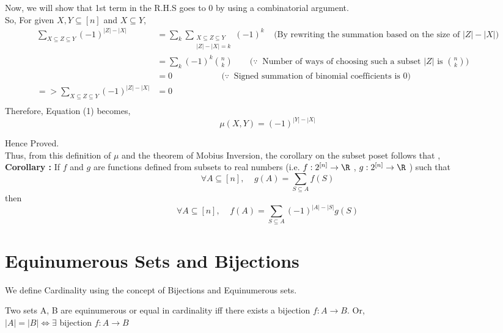\noindent Now, we will show that 1st term in the R.H.S goes to 0 by using a combinatorial argument.\\

\noindent So, For given $X, Y \subseteq [n]$ and $X \subseteq Y$,
\begin{align*}
    \sum_{X \subseteq Z \subseteq Y} (-1)^{|Z|-|X|} &= \sum_{k} \sum_{\substack{X \subseteq Z \subseteq Y\\ |Z| - |X| = k}} (-1)^k ~~~~~\textrm{(By rewriting the summation based on the size of $|Z| - |X|$)}\\
    &= \sum_{k} (-1)^k {n \choose k} ~~~~~~~~~\textrm{($\because~$ Number of ways of choosing such a subset $|Z|$ is ${n \choose k}$) }\\
    &= 0 ~~~~~~~~~~~~~~~~~~~~~~~~~~\textrm{($\because ~$ Signed summation of binomial coefficients is $0$)}\\
=> \sum_{X \subseteq Z \subseteq Y} (-1)^{|Z|-|X|} &= 0\\
\end{align*}
Therefore, Equation (1) becomes,\\

$$\mu (X,Y) = (-1)^{|Y|-|X|}$$

Hence Proved.\\

\noindent Thus, from this definition of $\mu$ and the theorem of Mobius Inversion, the corollary on the subset poset follows that ,\\

\noindent \textbf{Corollary :} If $f$ and $g$ are functions defined from subsets to real numbers (i.e. 
$f: 2^{[n]} \rightarrow \R$ , $g: 2^{[n]} \rightarrow \R $ ) such that
$$\forall A \subseteq [n], ~~~~~ g(A) = \sum_{S \subseteq A} f(S) $$
then
$$\forall A \subseteq [n], ~~~~~ f(A) = \sum\limits_{S \subseteq A} (-1)^{|A|- |S|}g(S)$$



\section{Equinumerous Sets and Bijections}

We define Cardinality using the concept of Bijections and Equinumerous sets.
\begin{theorem}
Two sets A, B are equinumerous or equal in cardinality iff there
exists a bijection $f: A \to B$. Or,\\

$ |A| = |B| \Leftrightarrow \exists$ bijection $f:A \to B $ \\

\end{theorem}

